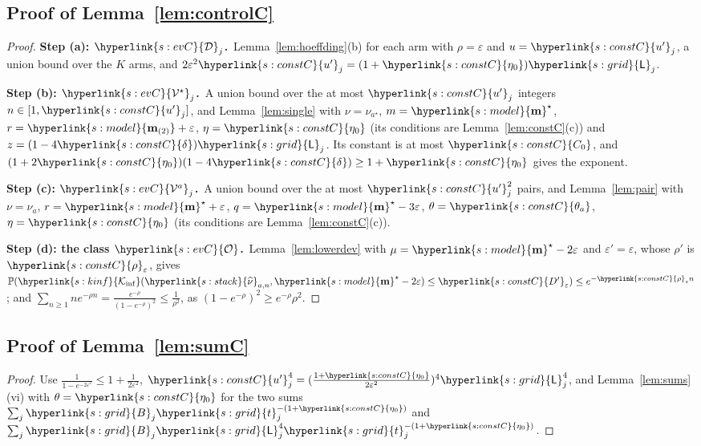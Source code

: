\documentclass[10pt]{article}
\newcommand{\sy}[2]{{\hyperlink{#1}{#2}}}
\newcommand{\PP}{\mathbb{P}}
\newcommand{\1}{\mathbf{1}}
\newcommand{\m}{\sy{s:model}{\mathbf{m}}}
\newcommand{\mtwo}{\sy{s:model}{\mathbf m_{(2)}}}
\newcommand{\Ki}{\sy{s:kinf}{\mathcal K_{\inf}}}
\newcommand{\hnu}{\sy{s:stack}{\widehat\nu}}
\newcommand{\tl}{\sy{s:grid}{t}}
\newcommand{\Lg}{\sy{s:grid}{\mathsf L}}
\newcommand{\Bg}{\sy{s:grid}{B}}
\newcommand{\ezz}{\sy{s:constC}{\eta_0}}
\newcommand{\dl}{\sy{s:constC}{\delta}}
\newcommand{\Cz}{\sy{s:constC}{C_{0}}}
\newcommand{\Dp}{\sy{s:constC}{D'}}
\newcommand{\rz}{\sy{s:constC}{\rho}}
\newcommand{\up}{\sy{s:constC}{u'}}
\newcommand{\thc}{\sy{s:constC}{\theta_a}}
\newcommand{\Dev}{\sy{s:evC}{\mathcal D}}
\newcommand{\Vs}{\sy{s:evC}{\mathcal V^\star}}
\newcommand{\Va}{\sy{s:evC}{\mathcal V^a}}
\newcommand{\cO}{\sy{s:evC}{\mathcal O}}
\newcommand{\stp}[2]{\par\medskip\noindent\textbf{Step #1: #2.}\ }
\begin{document}
\subsection{Proof of Lemma~\ref{lem:controlC}}\label{sec:pf-lem:controlC}
\begin{proof}
\stp{(a)}{$\Dev_j$}Lemma~\ref{lem:hoeffding}(b) for each arm with $\rho=\varepsilon$ and $u=\up_j$, a union bound over the $K$ arms, and $2\varepsilon^2\up_j=(1+\ezz)\Lg_j$.

\stp{(b)}{$\Vs_j$}A union bound over the at most $\up_j$ integers $n\in[1,\up_j]$, and Lemma~\ref{lem:single} with $\nu=\nu_{a^\star}$, $m=\m^\star$, $r=\mtwo+\varepsilon$, $\eta=\ezz$
(its conditions are Lemma~\ref{lem:constC}(c)) and $z=(1-4\dl)\Lg_j$. Its constant is at most $\Cz$, and $(1+2\ezz)(1-4\dl)\ge1+\ezz$ gives the exponent.

\stp{(c)}{$\Va_j$}A union bound over the at most $\up_j^2$ pairs, and Lemma~\ref{lem:pair} with $\nu=\nu_a$, $r=\m^\star+\varepsilon$, $q=\m^\star-3\varepsilon$, $\theta=\thc$, $\eta=\ezz$
(its conditions are Lemma~\ref{lem:constC}(c)).

\stp{(d)}{the class $\cO$}Lemma~\ref{lem:lowerdev} with $\mu=\m^\star-2\varepsilon$ and $\varepsilon'=\varepsilon$, whose $\rho'$ is $\rz_\varepsilon$, gives
$\PP(\Ki(\hnu_{a,n},\m^\star-2\varepsilon)\le\Dp_\varepsilon)\le e^{-\rz_\varepsilon n}$; and $\sum_{n\ge1}ne^{-\rho n}=\frac{e^{-\rho}}{(1-e^{-\rho})^2}\le\frac1{\rho^2}$, as $(1-e^{-\rho})^2\ge e^{-\rho}\rho^2$.
\end{proof}

\subsection{Proof of Lemma~\ref{lem:sumC}}\label{sec:pf-lem:sumC}
\begin{proof}
Use $\frac1{1-e^{-2\varepsilon^2}}\le1+\frac1{2\varepsilon^2}$, $\up_j^4=(\frac{1+\ezz}{2\varepsilon^2})^4\Lg_j^4$, and Lemma~\ref{lem:sums}(vi) with $\theta=\ezz$ for the two sums
$\sum_j\Bg_j\tl_j^{-(1+\ezz)}$ and $\sum_j\Bg_j\Lg_j^4\tl_j^{-(1+\ezz)}$.
\end{proof}
\end{document}
